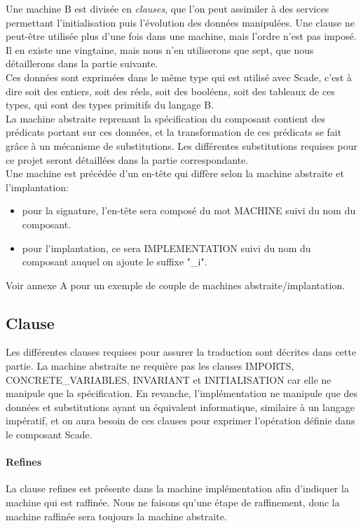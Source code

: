 Une machine B est divisée en \emph{clauses}, que l'on peut assimiler à
des services permettant l'initialisation puis l'évolution des données
manipulées. Une clause ne peut-être utilisée plus d'une fois dans une
machine, mais l'ordre n'est pas imposé. Il en existe une vingtaine,
mais nous n'en utiliserons que sept, que nous détaillerons dans la
partie suivante.\\ 
Ces données sont exprimées dans le même type qui est utilisé avec
Scade, c'est à dire soit des entiers, soit des réels, soit des
booléens, soit des tableaux de ces types, qui sont des types primitifs
du langage B. \\ 
La machine abstraite reprenant la spécification du composant contient
des prédicats portant sur ces données, et la transformation
de ces prédicats se fait grâce à un mécanisme de substitutions. Les
différentes substitutions requises pour ce projet seront détaillées
dans la partie correspondante. \\
Une machine est précédée d'un en-tête qui diffère selon la machine
abstraite et l'implantation:
\begin{itemize}
\item pour la signature, l'en-tête sera composé du mot MACHINE suivi
  du nom du composant.
\item pour l'implantation, ce sera IMPLEMENTATION suivi du nom du
  composant auquel on ajoute le suffixe "\_i".
\end{itemize}
Voir annexe A pour un exemple de couple de machines abstraite/implantation.



\subsection{Clause}
Les différentes clauses requises pour assurer la traduction sont
décrites dans cette partie. La machine abstraite ne requière pas les
clauses IMPORTS, CONCRETE\_VARIABLES, INVARIANT et INITIALISATION car
elle ne manipule que la spécification. En revanche, l'implémentation ne
manipule que des données et substitutions ayant un équivalent
informatique, similaire à un langage impératif, et on aura besoin de
ces clauses pour exprimer l'opération définie dans le composant Scade.

\paragraph{Refines}
La clause refines est présente dans la machine implémentation afin
d'indiquer la machine qui est raffinée. Nous ne faisons qu'une étape
de raffinement, donc la machine raffinée sera toujours la machine
abstraite. 

